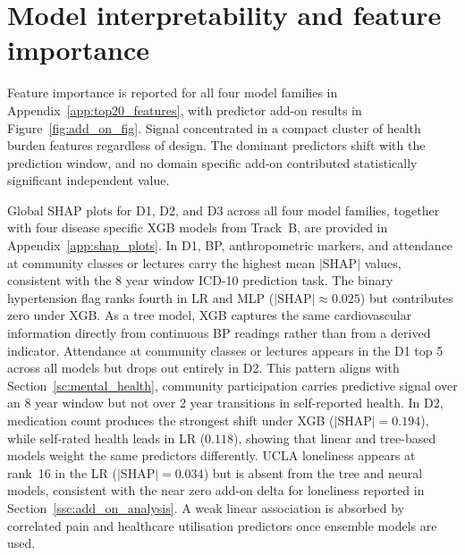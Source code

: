 \section{Model interpretability and feature importance}\label{sc:feature_importance}
Feature importance is reported for all four model families in Appendix~\ref{app:top20_features}, with predictor add-on results in Figure~\ref{fig:add_on_fig}. Signal concentrated in a compact cluster of health burden features regardless of design. The dominant predictors shift with the prediction window, and no domain specific add-on contributed statistically significant independent value.

Global \gls{SHAP} plots for D1, D2, and D3 across all four model families, together with four disease specific \gls{XGB} models from Track~B, are provided in Appendix~\ref{app:shap_plots}. In D1, \gls{BP}, anthropometric markers, and attendance at community classes or lectures carry the highest mean $|\text{SHAP}|$ values, consistent with the 8 year window ICD-10 prediction task. The binary hypertension flag ranks fourth in \gls{LR} and \gls{MLP} (${|\text{SHAP}|} \approx 0.025$) but contributes zero under \gls{XGB}. As a tree model, \gls{XGB} captures the same cardiovascular information directly from continuous \gls{BP} readings rather than from a derived indicator. Attendance at community classes or lectures appears in the D1 top 5 across all models but drops out entirely in D2. This pattern aligns with Section~\ref{sc:mental_health}, community participation carries predictive signal over an 8 year window but not over 2 year transitions in self-reported health. In D2, medication count produces the strongest shift under \gls{XGB} (${|\text{SHAP}|} = 0.194$), while self-rated health leads in \gls{LR} ($0.118$), showing that linear and tree-based models weight the same predictors differently. \gls{UCLA} loneliness appears at rank~16 in the \gls{LR} (${|\text{SHAP}|} = 0.034$) but is absent from the tree and neural models, consistent with the near zero add-on delta for loneliness reported in Section~\ref{ssc:add_on_analysis}. A weak linear association is absorbed by correlated pain and healthcare utilisation predictors once ensemble models are used.

